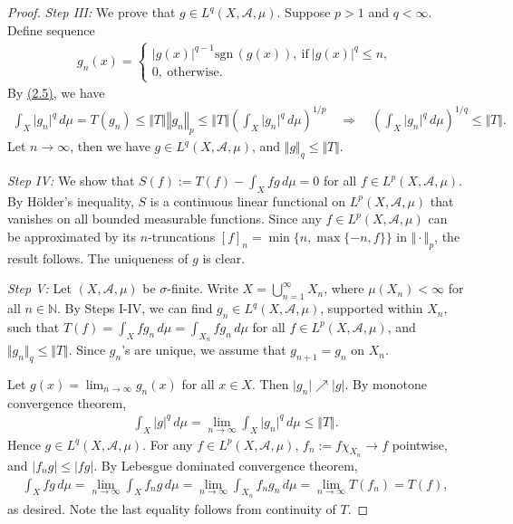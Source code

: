\documentclass{article}
\begin{document}
\begin{proof}
\textit{Step III:} We prove that $g\in L^q(X,\mathscr{A},\mu)$. Suppose $p>1$ and $q<\infty$. Define sequence
\begin{align*}
	g_n(x) = \begin{cases}
		\vert g(x)\vert^{q-1}\mathrm{sgn}\,(g(x)),\ \text{if}\ \vert g(x)\vert^q \leq n,\\
		0,\ \text{otherwise}.
	\end{cases}
\end{align*}
By \hyperref[eq:2.5]{(2.5)}, we have
\begin{align*}
	\int_X \vert g_n\vert^q\,d\mu = T(g_n) \leq \Vert T\Vert\left\Vert g_n\right\Vert_p \leq\left\Vert T\right\Vert\left(\int_X \vert g_n\vert^q\,d\mu\right)^{1/p}\quad\Rightarrow\quad \left(\int_X \vert g_n\vert^q\,d\mu\right)^{1/q}\leq\Vert T\Vert.
\end{align*}
Let $n\to\infty$, then we have $g\in L^q(X,\mathscr{A},\mu)$, and $\Vert g\Vert_q\leq\Vert T\Vert$.
\vspace{0.1cm}

\textit{Step IV:} We show that $S(f) := T(f) - \int_X fg\,d\mu = 0$ for all $f\in L^p(X,\mathscr{A},\mu)$. By Hölder's inequality, $S$ is a continuous linear functional on $L^p(X,\mathscr{A},\mu)$ that vanishes on all bounded measurable functions. Since any $f\in L^p(X,\mathscr{A},\mu)$ can be approximated by its $n$-truncations $[f]_n=\min\{n,\max\{-n,f\}\}$ in $\Vert\cdot\Vert_p$, the result follows. The uniqueness of $g$ is clear.
\vspace{0.1cm}

\textit{Step V:} Let $(X,\mathscr{A},\mu)$ be $\sigma$-finite. Write $X=\bigcup_{n=1}^\infty X_n$, where $\mu(X_n)<\infty$ for all $n\in\mathbb{N}$. By Steps I-IV, we can find $g_n\in L^q(X,\mathscr{A},\mu)$, supported within $X_n$, such that $T(f)=\int_X fg_n\,d\mu=\int_{X_n} fg_n\,d\mu$ for all $f\in L^p(X,\mathscr{A},\mu)$, and $\Vert g_n\Vert_q\leq\Vert T\Vert$. Since $g_n$'s are unique, we assume that $g_{n+1}=g_n$ on $X_n$.

Let $g(x)=\lim_{n\to\infty}g_n(x)$ for all $x\in X$. Then $\vert g_n\vert\nearrow \vert g\vert$. By monotone convergence theorem, 
\begin{align*}
	\int_X\vert g\vert^q\,d\mu = \lim_{n\to\infty}\int_X\vert g_n\vert^q\,d\mu \leq\Vert T\Vert.
\end{align*}
Hence $g\in L^q(X,\mathscr{A},\mu)$. For any $f\in L^p(X,\mathscr{A},\mu)$, $f_n:=f\chi_{X_n}\to f$ pointwise, and $\vert f_ng\vert\leq\vert fg\vert$. By Lebesgue dominated convergence theorem,
\begin{align*}
	\int_X fg\,d\mu = \lim_{n\to\infty}\int_X f_ng\,d\mu  = \lim_{n\to\infty}\int_{X_n} f_ng_n\,d\mu = \lim_{n\to\infty} T(f_n) = T(f),
\end{align*}
as desired. Note the last equality follows from continuity of $T$.
\end{proof}
\end{document}
